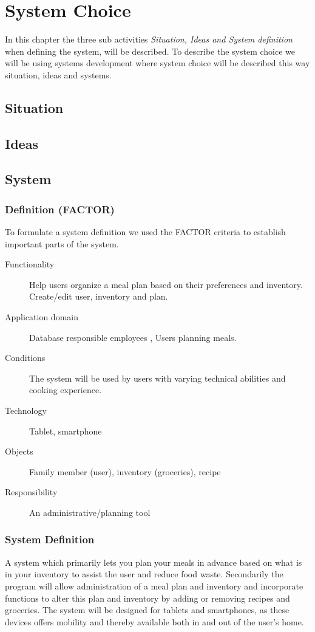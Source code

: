 \chapter{System Choice}
In this chapter the three sub activities \textit{Situation, Ideas and System definition} when defining the system, will be described. To describe the system choice we will be using systems development where system choice will be described this way situation, ideas and systems.

\section{Situation}


\section{Ideas}


\section{System}
\subsection{Definition (FACTOR)}
To formulate a system definition we used the FACTOR \cite{OOAD_BATOF} criteria to establish important parts of the system.

\begin{description}
	\item[Functionality] Help users organize a meal plan based on their preferences and inventory. Create/edit user, inventory and plan.
	\item[Application domain] Database responsible employees , Users planning meals.
	\item[Conditions] The system will be used by users with varying technical abilities and cooking experience.
	\item[Technology] Tablet, smartphone
	\item[Objects] Family member (user), inventory (groceries), recipe
	\item[Responsibility] An administrative/planning tool
\end{description}

\subsection{System Definition}
A system which primarily lets you plan your meals in advance based on what is in your inventory to assist the user and reduce food waste.
Secondarily the program will allow administration of a meal plan and inventory and incorporate functions to alter this plan and inventory by adding or removing recipes and groceries.
The system will be designed for tablets and smartphones, as these devices offers mobility and thereby available both in and out of the user's home.